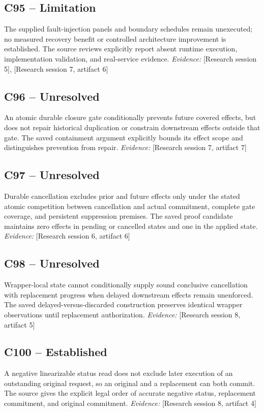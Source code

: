 \documentclass[11pt]{article}
\begin{document}
\begin{sloppypar}
\subsection{C95 -- Limitation}
The supplied fault-injection panels and boundary schedules remain unexecuted; no measured recovery benefit or controlled architecture improvement is established.
The source reviews explicitly report absent runtime execution, implementation validation, and real-service evidence.
\textit{Evidence: }[Research session 5], [Research session 7, artifact 6]
\subsection{C96 -- Unresolved}
An atomic durable closure gate conditionally prevents future covered effects, but does not repair historical duplication or constrain downstream effects outside that gate.
The saved containment argument explicitly bounds its effect scope and distinguishes prevention from repair.
\textit{Evidence: }[Research session 7, artifact 7]
\subsection{C97 -- Unresolved}
Durable cancellation excludes prior and future effects only under the stated atomic competition between cancellation and actual commitment, complete gate coverage, and persistent suppression premises.
The saved proof candidate maintains zero effects in pending or cancelled states and one in the applied state.
\textit{Evidence: }[Research session 6, artifact 6]
\subsection{C98 -- Unresolved}
Wrapper-local state cannot conditionally supply sound conclusive cancellation with replacement progress when delayed downstream effects remain unenforced.
The saved delayed-versus-discarded construction preserves identical wrapper observations until replacement authorization.
\textit{Evidence: }[Research session 8, artifact 5]
\subsection{C100 -- Established}
A negative linearizable status read does not exclude later execution of an outstanding original request, so an original and a replacement can both commit.
The source gives the explicit legal order of accurate negative status, replacement commitment, and original commitment.
\textit{Evidence: }[Research session 8, artifact 4]

\end{sloppypar}
\end{document}
